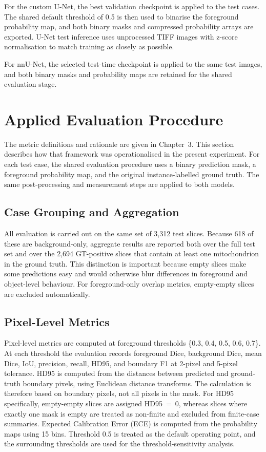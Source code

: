 \documentclass[logo,bsc,singlespacing,parskip,online]{infthesis}
\begin{document}
For the custom U-Net, the best validation checkpoint is applied to the
test cases. The shared default threshold of 0.5 is then used
to binarise the foreground probability map, and both binary masks and
compressed probability arrays are exported. U-Net test inference uses unprocessed TIFF
images with z-score normalisation to match training as closely as possible.

For nnU-Net, the selected test-time checkpoint is applied to the same test
images, and both binary masks and probability maps are retained for the shared
evaluation stage. 

\section{Applied Evaluation Procedure}

The metric definitions and rationale are given in Chapter~3. This section
describes how that framework was operationalised in the present experiment. For
each test case, the shared evaluation procedure uses a binary prediction mask,
a foreground probability map, and the original instance-labelled ground truth.
The same post-processing and measurement steps are applied to both models.

\subsection{Case Grouping and Aggregation}

All evaluation is carried out on the same set of 3,312 test slices.
Because 618 of these are background-only, aggregate results are reported both
over the full test set and over the 2,694 GT-positive slices
that contain at least one mitochondrion in the ground truth. This distinction
is important because empty slices make some predictions easy and would
otherwise blur differences in foreground and object-level behaviour. For
foreground-only overlap metrics, empty-empty slices are excluded automatically.

\subsection{Pixel-Level Metrics}

Pixel-level metrics are computed at foreground thresholds
\{0.3, 0.4, 0.5, 0.6, 0.7\}. At each threshold the evaluation records
foreground Dice, background Dice, mean Dice, IoU, precision, recall, HD95, and
boundary F1 at 2-pixel and 5-pixel tolerance. HD95 is computed from the distances 
between predicted and ground-truth boundary pixels, using Euclidean distance 
transforms. The calculation is therefore based on boundary pixels, not all
pixels in the mask. For HD95 specifically, empty-empty slices are assigned
HD95~=~0, whereas slices where exactly one mask is empty are treated as
non-finite and excluded from finite-case summaries.
Expected Calibration Error (ECE) is computed from the probability maps using
15 bins. Threshold 0.5 is treated as the default operating point, and the
surrounding thresholds are used for the threshold-sensitivity analysis.
\end{document}
